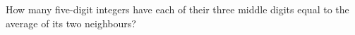 How many five-digit integers have each of their three middle digits equal to the average of its two neighbours?
